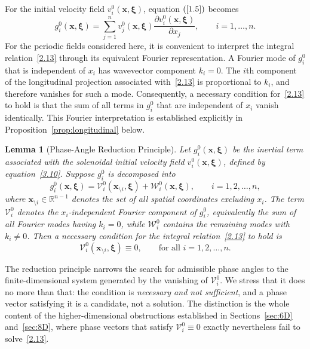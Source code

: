 \documentclass[11pt]{jfm}
\newtheorem{lemma}{Lemma}[section]
\numberwithin{equation}{section}
\begin{document}
For the initial velocity field $v_i^0(\boldsymbol{x}, \boldsymbol{\xi})$, equation $\left(\ref{1.5}\right)$ becomes
\begin{equation}
\label{3.10}
 g_i^0(\boldsymbol{x}, \boldsymbol{\xi}) = \sum_{j=1}^n v_j^0(\boldsymbol{x}, \boldsymbol{\xi}) \frac{\partial v_i^0(\boldsymbol{x}, \boldsymbol{\xi})}{\partial x_j}, \qquad i = 1, \dots, n.
\end{equation}
For the periodic fields considered here, it is convenient to interpret the integral relation~\eqref{2.13} through its equivalent Fourier representation. A Fourier mode of $g_i^0$ that is independent of $x_i$ has wavevector component $k_i=0$. The $i$th component of the longitudinal projection associated with~\eqref{2.13} is proportional to $k_i$, and therefore vanishes for such a mode. Consequently, a necessary condition for~\eqref{2.13} to hold is that the sum of all terms in $g_i^0$ that are independent of $x_i$ vanish identically. This Fourier interpretation is established explicitly in Proposition~\ref{prop:longitudinal} below.
\begin{lemma}[Phase-Angle Reduction Principle]
\label{lem:reduction}
Let \(g_i^0(\boldsymbol{x},\boldsymbol{\xi})\) be the inertial term associated with the solenoidal initial velocity field \(v_i^0(\boldsymbol{x},\boldsymbol{\xi})\), defined by equation~\eqref{3.10}. Suppose \(g_i^0\) is decomposed into
\begin{equation}
\label{3.11}
g_i^0(\boldsymbol{x}, \boldsymbol{\xi}) = \mathcal{V}_i^0(\boldsymbol{x}_{\setminus i}, \boldsymbol{\xi}) + \mathcal{W}_i^0(\boldsymbol{x}, \boldsymbol{\xi}), \qquad i = 1, 2, \dots, n,
\end{equation}
where \( \boldsymbol{x}_{\setminus i} \in \mathbb{R}^{n-1} \) denotes the set of all spatial coordinates excluding \( x_i \). The term $\mathcal{V}_i^0$ denotes the $x_i$-independent Fourier component of $g_i^0$,
equivalently the sum of all Fourier modes having $k_i=0$, while $\mathcal{W}_i^0$ contains the
remaining modes with $k_i\neq0$. Then a necessary condition for the integral relation~\eqref{2.13} to hold is
\begin{equation}
\label{3.12}
\mathcal{V}_i^0(\boldsymbol{x}_{\setminus i}, \boldsymbol{\xi}) \equiv 0, \qquad \text{for all } i = 1, 2, \dots, n.
\end{equation}
\end{lemma}
The reduction principle narrows the search for admissible phase angles to the
finite-dimensional system generated by the vanishing of \(\mathcal V_i^0\). We stress that it
does no more than that: the condition is \emph{necessary and not sufficient}, and a phase
vector satisfying it is a candidate, not a solution. The distinction is the whole content of the higher-dimensional obstructions established in
Sections~\ref{sec:6D} and~\ref{sec:8D}, where phase vectors that satisfy
$\mathcal V_i^0\equiv0$ exactly nevertheless fail to solve~\eqref{2.13}.
\end{document}
